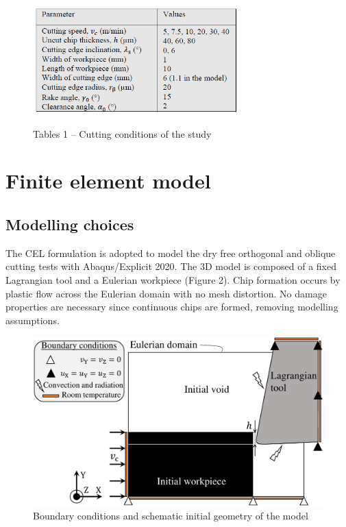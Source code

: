 \documentclass[final,5p,times,twocolumn]{elsarticle}
\begin{document}
\begin{figure}[h]
\centering
\caption{Tables 1 -- Cutting conditions of the study}
\includegraphics[width = 8cm]{Figures/Tab1}
\label{Tab1}
\end{figure}

\section{Finite element model}
\label{FEM}

\subsection{Modelling choices}

The CEL formulation is adopted to model the dry free orthogonal and oblique cutting tests with Abaqus/Explicit 2020. The 3D model is composed of a fixed Lagrangian tool and a Eulerian workpiece (Figure 2). Chip formation occurs by plastic flow across the Eulerian domain with no mesh distortion. No damage properties are necessary since continuous chips are formed, removing modelling assumptions.

\begin{figure}[h]
\centering
\includegraphics{Figures/BC}
\caption{Boundary conditions and schematic initial geometry of the model}
\label{BC}
\end{figure}
\end{document}
